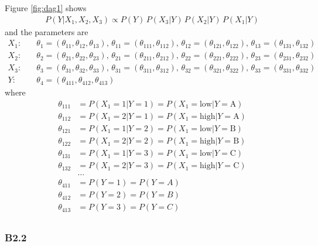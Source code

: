 \documentclass{article}
\begin{document}
Figure \ref{fig:dag1} shows \begin{align*}
    P(Y|X_1,X_2,X_3) \propto P(Y) \, P(X_3|Y) \, P(X_2|Y) \, P(X_1|Y)
\end{align*} and the parameters are \begin{align*}
    X_1 :&\quad \theta_1 = (\theta_{11}, \theta_{12}, \theta_{13}) ,\, \theta_{11} = (\theta_{111}, \theta_{112}) ,\, \theta_{12} = (\theta_{121}, \theta_{122}) ,\, \theta_{13} = (\theta_{131}, \theta_{132}) \\
    X_2 :&\quad \theta_2 = (\theta_{21}, \theta_{22}, \theta_{23}) ,\, \theta_{21} = (\theta_{211}, \theta_{212}) ,\, \theta_{22} = (\theta_{221}, \theta_{222}) ,\, \theta_{23} = (\theta_{231}, \theta_{232}) \\
    X_3 :&\quad \theta_3 = (\theta_{31}, \theta_{32}, \theta_{33}) ,\, \theta_{31} = (\theta_{311}, \theta_{312}) ,\, \theta_{32} = (\theta_{321}, \theta_{322}) ,\, \theta_{33} = (\theta_{331}, \theta_{332}) \\
    Y :&\quad \theta_{4} = (\theta_{411}, \theta_{412}, \theta_{413})
\end{align*} where \begin{align*}
    \theta_{111} &= P(X_1{=}1|Y{=}1) = P(X_1 {=} \text{low} | Y {=} \text{A}) \\
    \theta_{112} &= P(X_1{=}2|Y{=}1) = P(X_1 {=} \text{high} | Y {=} \text{A}) \\
    \theta_{121} &= P(X_1{=}1|Y{=}2) = P(X_1 {=} \text{low} | Y {=} \text{B}) \\
    \theta_{122} &= P(X_1{=}2|Y{=}2) = P(X_1 {=} \text{high} | Y {=} \text{B}) \\
    \theta_{131} &= P(X_1{=}1|Y{=}3) = P(X_1 {=} \text{low} | Y {=} \text{C}) \\
    \theta_{132} &= P(X_1{=}2|Y{=}3) = P(X_1 {=} \text{high} | Y {=} \text{C}) \\
    &\dots \\
    \theta_{411} &= P(Y{=}1) = P(Y{=}A) \\
    \theta_{412} &= P(Y{=}2) = P(Y{=}B) \\
    \theta_{413} &= P(Y{=}3) = P(Y{=}C) \\
\end{align*}

\subsubsection*{B2.2}
\label{sec:B:B2:2}
\end{document}
